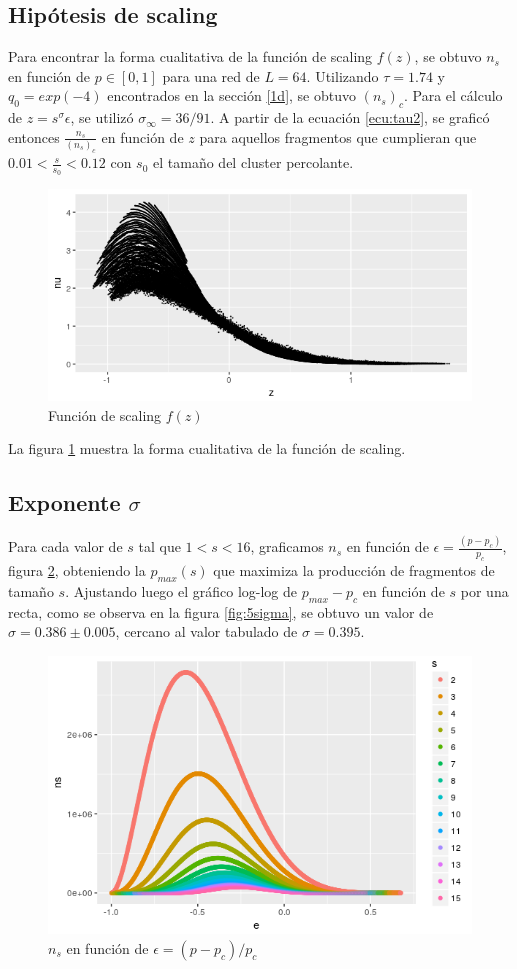 \documentclass[%
 reprint,
 amsmath,amssymb,
 aps,
spanish]{revtex4-1}
\begin{document}
\subsection{\label{4} Hipótesis de scaling }
Para encontrar la forma cualitativa de la función de scaling $f(z)$, se obtuvo $n_s$ en función de $p \in [0, 1]$ para una red de $L=64$.
Utilizando $\tau=1.74$ y $q_0=exp(-4)$ encontrados en la sección \ref{1d}, se obtuvo $(n_s)_c$. Para el cálculo de $z=s^\sigma\epsilon$, se utilizó $\sigma_{\infty}=36/91$. A partir de la ecuación \ref{ecu:tau2}, se graficó entonces $\frac{n_s}{(n_s)_c}$ en función de $z$ para aquellos fragmentos que cumplieran que $0.01 < \frac{s}{s_0} < 0.12$ con $s_0$ el tamaño del cluster percolante.
\begin{figure}[h]
  \centering
  \includegraphics[width=.9\linewidth]{ej4/scaling}
\caption{Función de scaling $f(z)$}
\label{fig:4}
\end{figure}
La figura \ref{fig:4} muestra la forma cualitativa de la función de scaling.

\subsection{\label{5} Exponente $\sigma$}
Para cada valor de $s$ tal que $1 < s < 16$, graficamos $n_s$ en función de $\epsilon=\frac{(p-p_c)}{p_c}$, figura \ref{fig:5ns_vs_e}, obteniendo la $p_{max}(s)$ que maximiza la producción de fragmentos de tamaño $s$. Ajustando luego el gráfico log-log de $p_{max}-p_c$ en función de $s$ por una recta, como se observa en la figura \ref{fig:5sigma}, se obtuvo un valor de $\sigma=0.386\pm0.005$, cercano al valor tabulado de $\sigma=0.395$.

\begin{figure}[h]
  \centering
  \includegraphics[width=.9\linewidth]{ej5/ns_vs_e}
\caption{$n_s$ en función de $\epsilon=(p-p_c)/p_c$}
\label{fig:5ns_vs_e}
\end{figure}
\end{document}
